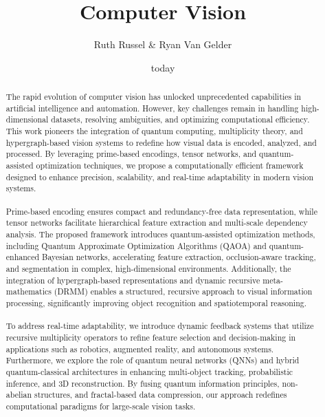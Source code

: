 \documentclass{article}
\theoremstyle{plain}
\begin{document}
\title{Computer Vision}

\author{Ruth Russel \& Ryan Van Gelder}
\date{today}
\maketitle

\begin{abstract}
The rapid evolution of computer vision has unlocked unprecedented capabilities in artificial intelligence and automation. However, key challenges remain in handling high-dimensional datasets, resolving ambiguities, and optimizing computational efficiency. This work pioneers the integration of quantum computing, multiplicity theory, and hypergraph-based vision systems to redefine how visual data is encoded, analyzed, and processed. By leveraging prime-based encodings, tensor networks, and quantum-assisted optimization techniques, we propose a computationally efficient framework designed to enhance precision, scalability, and real-time adaptability in modern vision systems.

\paragraph{} Prime-based encoding ensures compact and redundancy-free data representation, while tensor networks facilitate hierarchical feature extraction and multi-scale dependency analysis. The proposed framework introduces quantum-assisted optimization methods, including Quantum Approximate Optimization Algorithms (QAOA) and quantum-enhanced Bayesian networks, accelerating feature extraction, occlusion-aware tracking, and segmentation in complex, high-dimensional environments. Additionally, the integration of hypergraph-based representations and dynamic recursive meta-mathematics (DRMM) enables a structured, recursive approach to visual information processing, significantly improving object recognition and spatiotemporal reasoning.

\paragraph{} To address real-time adaptability, we introduce dynamic feedback systems that utilize recursive multiplicity operators to refine feature selection and decision-making in applications such as robotics, augmented reality, and autonomous systems. Furthermore, we explore the role of quantum neural networks (QNNs) and hybrid quantum-classical architectures in enhancing multi-object tracking, probabilistic inference, and 3D reconstruction. By fusing quantum information principles, non-abelian structures, and fractal-based data compression, our approach redefines computational paradigms for large-scale vision tasks.
\end{abstract}
\end{document}
